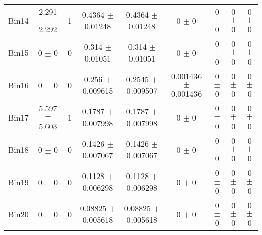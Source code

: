 \begin{tabular}{@{\extracolsep{4pt}}lcccccccc@{}}
     Bin14 & 2.291 $\pm$ 2.292 & 1 & 0.4364 $\pm$ 0.01248 & 0.4364 $\pm$ 0.01248 & 0 $\pm$ 0 & 0 $\pm$ 0 & 0 $\pm$ 0 & 0 $\pm$ 0 \\ 
     Bin15 & 0 $\pm$ 0 & 0 & 0.314 $\pm$ 0.01051 & 0.314 $\pm$ 0.01051 & 0 $\pm$ 0 & 0 $\pm$ 0 & 0 $\pm$ 0 & 0 $\pm$ 0 \\ 
     Bin16 & 0 $\pm$ 0 & 0 & 0.256 $\pm$ 0.009615 & 0.2545 $\pm$ 0.009507 & 0.001436 $\pm$ 0.001436 & 0 $\pm$ 0 & 0 $\pm$ 0 & 0 $\pm$ 0 \\ 
     Bin17 & 5.597 $\pm$ 5.603 & 1 & 0.1787 $\pm$ 0.007998 & 0.1787 $\pm$ 0.007998 & 0 $\pm$ 0 & 0 $\pm$ 0 & 0 $\pm$ 0 & 0 $\pm$ 0 \\ 
     Bin18 & 0 $\pm$ 0 & 0 & 0.1426 $\pm$ 0.007067 & 0.1426 $\pm$ 0.007067 & 0 $\pm$ 0 & 0 $\pm$ 0 & 0 $\pm$ 0 & 0 $\pm$ 0 \\ 
     Bin19 & 0 $\pm$ 0 & 0 & 0.1128 $\pm$ 0.006298 & 0.1128 $\pm$ 0.006298 & 0 $\pm$ 0 & 0 $\pm$ 0 & 0 $\pm$ 0 & 0 $\pm$ 0 \\ 
     Bin20 & 0 $\pm$ 0 & 0 & 0.08825 $\pm$ 0.005618 & 0.08825 $\pm$ 0.005618 & 0 $\pm$ 0 & 0 $\pm$ 0 & 0 $\pm$ 0 & 0 $\pm$ 0 \\ 
\hline\hline
  \end{tabular}
